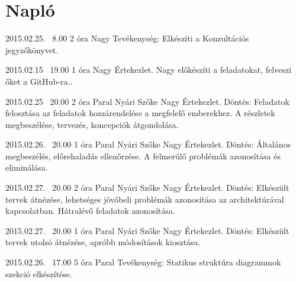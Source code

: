 %
\section{Napló}

\begin{naplo}

\bejegyzes
{2015.02.25. ~8.00}
{2 óra}
{Nagy} 
{Tevékenység: Elkészíti a Konzultációs jegyzőkönyvet.\newline } 

\bejegyzes
{2015.02.15 ~19.00}
{1 óra}
{Nagy} 
{Értekezlet.
Nagy előkészíti a feladatokat, felveszi őket a GitHub-ra..} 

\bejegyzes
{2015.02.25 ~20.00}
{2 óra}
{Paral \newline Nyári \newline Szőke \newline Nagy} 
{Értekezlet.
Döntés: Feladatok felosztása az feladatok hozzárendelése a megfelelő emberekhez. A részletek megbeszélése, tervezés, koncepciók átgondolása.\newline } 

\bejegyzes
{2015.02.26. ~20.00}
{1 óra}
{Paral \newline Nyári \newline Szőke \newline Nagy} 
{Értekezlet.
Döntés: Általános megbeszélés, előrehaladás ellenőrzése. A felmerülő problémák azonosítása és eliminálása. \newline } 

\bejegyzes
{2015.02.27. ~20.00}
{2 óra}
{Paral \newline Nyári \newline Szőke \newline Nagy} 
{Értekezlet.
Döntés: Elkészült tervek átnézése, lehetséges jövőbeli problémák azonosítása az architektúrával kapcsolatban. Hátralévő feladatok azonosítása.\newline } 

\bejegyzes
{2015.02.27. ~20.00}
{1 óra}
{Paral \newline Nyári \newline Szőke \newline Nagy} 
{Értekezlet.
Döntés: Elkészült tervek utolsó átnézése, apróbb módosítások kiosztása.\newline } 

\bejegyzes
{2015.02.26. ~17.00}
{5 óra}
{Paral} 
{Tevékenység: Statikus struktúra diagrammok szekció elkészítése.\newline } 


\end{naplo}
